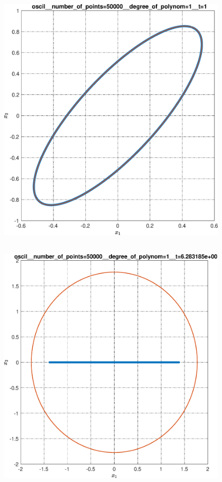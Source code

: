 \documentclass[../main.tex]{subfiles}
\begin{document}
\begin{figure}[ht!]
\begin{minipage}[b]{.3\linewidth}
  		\includegraphics[width=\linewidth]{images/oscil__number_of_points=50000__degree_of_polynom=1__t=1.eps}
  		\label{fig:ap:oscilN5104k1T1}
  	\end{minipage} 
  	\hfill
  	\begin{minipage}[b]{.3\linewidth} 
  		\small
  		\centering
  		\includegraphics[width=\linewidth]{images/oscil__number_of_points=50000__degree_of_polynom=1__t=2pi.eps}

\end{minipage}
\end{figure}
\end{document}
